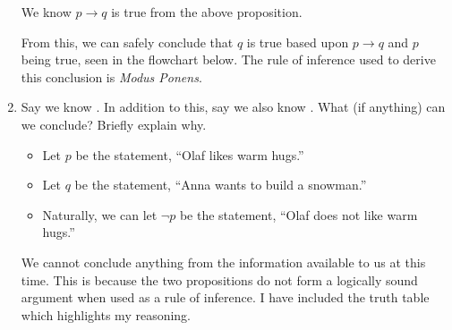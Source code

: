 \documentclass{article}
\begin{document}
\begin{enumerate}
          We know $p \rightarrow q$ is true from the above proposition.

          From this, we can safely conclude that $q$ is true based upon $p \rightarrow q$
          and $p$ being true, seen in the flowchart below. The rule of inference used to
          derive this conclusion is \textit{Modus Ponens}.

          \begin{center}
          \end{center}

          \newpage

    \item Say we know . In addition to this, say
          we also know . What (if
          anything) can we conclude? Briefly explain why.

          \begin{itemize}
              \item Let $p$ be the statement, ``Olaf likes warm hugs.''
              \item Let $q$ be the statement, ``Anna wants to build a snowman.''
              \item Naturally, we can let $\neg p$ be the statement, ``Olaf does not like warm
                    hugs.''
          \end{itemize}

          We cannot conclude anything from the information available to us at this time.
          This is because the two propositions do not form a logically sound argument
          when used as a rule of inference. I have included the truth table which
          highlights my reasoning.


\end{enumerate}
\end{document}
